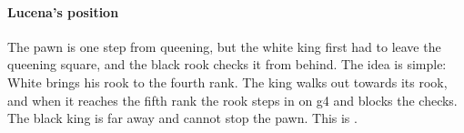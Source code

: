 \paragraph{Lucena's position}


The pawn is one step from queening, but the white king first had to leave the queening square,
and the black rook checks it from behind. The idea is simple: White brings his rook to the fourth
rank. The king walks out towards its rook, and when it reaches the fifth rank the rook steps in
on g4 and blocks the checks. The black king is far away and cannot stop the pawn. This is
.
